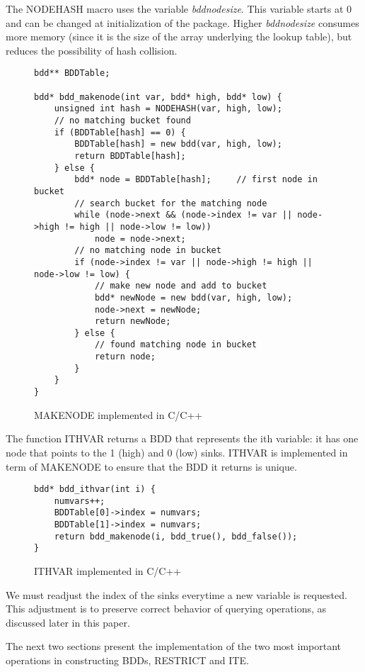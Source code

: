 \documentclass[12pt]{article}
\begin{document}
The NODEHASH macro uses the variable \textit{bddnodesize}. This variable starts at 0 and can be changed at initialization of the package. Higher \textit{bddnodesize} consumes more memory (since it is the size of the array underlying the lookup table), but reduces the possibility of hash collision.

\begin{figure}[h!]
\begin{lstlisting}
bdd** BDDTable;

bdd* bdd_makenode(int var, bdd* high, bdd* low) {
    unsigned int hash = NODEHASH(var, high, low);
    // no matching bucket found
    if (BDDTable[hash] == 0) {
        BDDTable[hash] = new bdd(var, high, low);
        return BDDTable[hash];
    } else { 
        bdd* node = BDDTable[hash];     // first node in bucket
        // search bucket for the matching node
		while (node->next && (node->index != var || node->high != high || node->low != low))
            node = node->next;
        // no matching node in bucket
        if (node->index != var || node->high != high || node->low != low) {
            // make new node and add to bucket
            bdd* newNode = new bdd(var, high, low);
            node->next = newNode;
            return newNode;
        } else {
            // found matching node in bucket
            return node;
        }
    }
}
\end{lstlisting}
\caption{MAKENODE implemented in C/C++}
\end{figure}

The function ITHVAR returns a BDD that represents the ith variable: it has one node that points to the 1 (high) and 0 (low) sinks. ITHVAR is implemented in term of MAKENODE to ensure that the BDD it returns is unique.

\begin{figure}[h!]
\begin{lstlisting}
bdd* bdd_ithvar(int i) {
    numvars++;
    BDDTable[0]->index = numvars;
    BDDTable[1]->index = numvars;
    return bdd_makenode(i, bdd_true(), bdd_false());
}
\end{lstlisting}
\caption{ITHVAR implemented in C/C++}
\end{figure}

We must readjust the index of the sinks everytime a new variable is requested.
This adjustment is to preserve correct behavior of querying operations, as discussed later in this paper.

The next two sections present the implementation of the two most important operations in constructing BDDs, RESTRICT and ITE.
\end{document}
